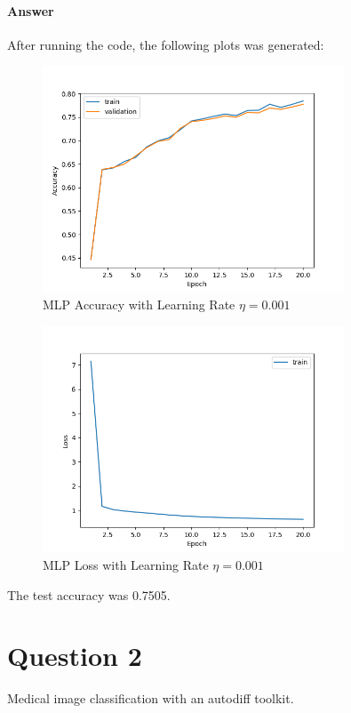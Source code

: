 \documentclass{article}
\begin{document}
\paragraph{Answer} After running the code, the following plots was generated:
\begin{figure}[H]
    \centering
    \includegraphics[width=0.8\textwidth]{"plots/mlp_validation_training.png"}
    \caption{MLP Accuracy with Learning Rate $\eta= 0.001$}
    \label{1.2.b 0.001 Plot}
\end{figure}


\begin{figure}[H]
    \centering
    \includegraphics[width=0.8\textwidth]{"plots/mlp_loss.png"}
    \caption{MLP Loss with Learning Rate $\eta= 0.001$}
    \label{1.2.b Loss Plot}
\end{figure}

The test accuracy was 0.7505.

\section{Question 2}
Medical image classification with an autodiff toolkit.
\end{document}
